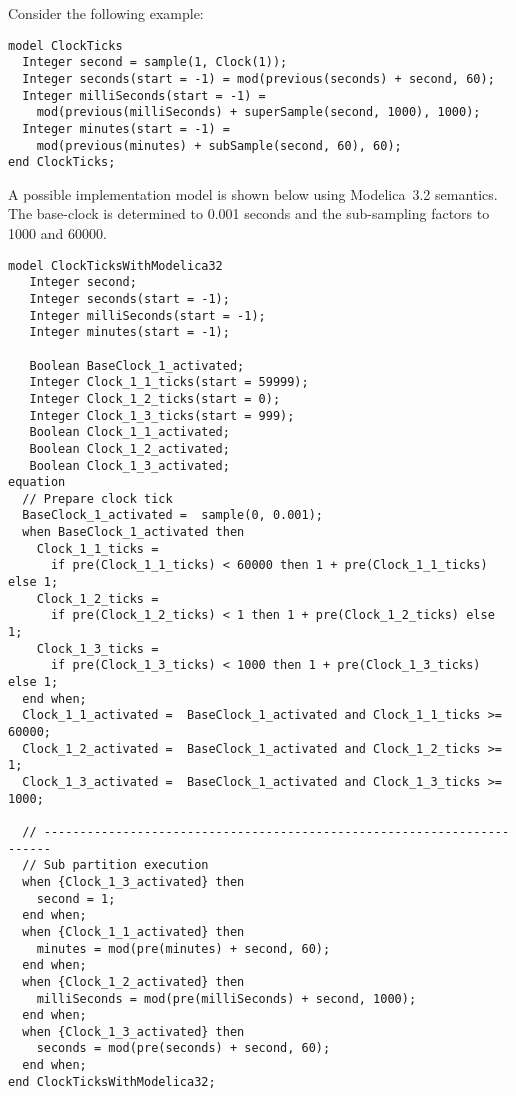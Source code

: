 \begin{nonnormative}
Consider the following example:
\begin{lstlisting}[language=modelica]
model ClockTicks
  Integer second = sample(1, Clock(1));
  Integer seconds(start = -1) = mod(previous(seconds) + second, 60);
  Integer milliSeconds(start = -1) =
    mod(previous(milliSeconds) + superSample(second, 1000), 1000);
  Integer minutes(start = -1) =
    mod(previous(minutes) + subSample(second, 60), 60);
end ClockTicks;
\end{lstlisting}

A possible implementation model is shown below using Modelica~3.2 semantics.
The base-clock is determined to 0.001 seconds and the sub-sampling factors to 1000 and 60000.

\begin{lstlisting}[language=modelica]
model ClockTicksWithModelica32
   Integer second;
   Integer seconds(start = -1);
   Integer milliSeconds(start = -1);
   Integer minutes(start = -1);

   Boolean BaseClock_1_activated;
   Integer Clock_1_1_ticks(start = 59999);
   Integer Clock_1_2_ticks(start = 0);
   Integer Clock_1_3_ticks(start = 999);
   Boolean Clock_1_1_activated;
   Boolean Clock_1_2_activated;
   Boolean Clock_1_3_activated;
equation
  // Prepare clock tick
  BaseClock_1_activated =  sample(0, 0.001);
  when BaseClock_1_activated then
    Clock_1_1_ticks =
      if pre(Clock_1_1_ticks) < 60000 then 1 + pre(Clock_1_1_ticks) else 1;
    Clock_1_2_ticks =
      if pre(Clock_1_2_ticks) < 1 then 1 + pre(Clock_1_2_ticks) else 1;
    Clock_1_3_ticks =
      if pre(Clock_1_3_ticks) < 1000 then 1 + pre(Clock_1_3_ticks) else 1;
  end when;
  Clock_1_1_activated =  BaseClock_1_activated and Clock_1_1_ticks >= 60000;
  Clock_1_2_activated =  BaseClock_1_activated and Clock_1_2_ticks >= 1;
  Clock_1_3_activated =  BaseClock_1_activated and Clock_1_3_ticks >= 1000;

  // -----------------------------------------------------------------------
  // Sub partition execution
  when {Clock_1_3_activated} then
    second = 1;
  end when;
  when {Clock_1_1_activated} then
    minutes = mod(pre(minutes) + second, 60);
  end when;
  when {Clock_1_2_activated} then
    milliSeconds = mod(pre(milliSeconds) + second, 1000);
  end when;
  when {Clock_1_3_activated} then
    seconds = mod(pre(seconds) + second, 60);
  end when;
end ClockTicksWithModelica32;
\end{lstlisting}
\end{nonnormative}
